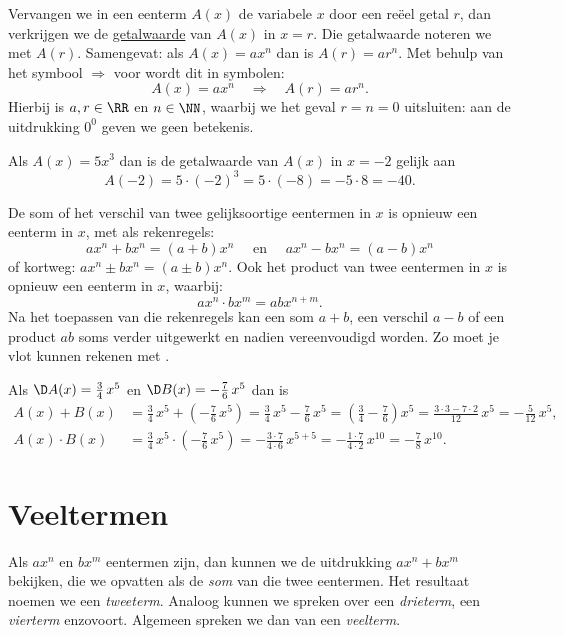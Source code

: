 \documentclass{ximera}
\begin{document}
Vervangen we in een eenterm $A(x)$ de variabele $x$ door een re\"eel getal $r$, dan verkrijgen we de \underline{getalwaarde} van $A(x)$ in $x = r$. Die getalwaarde noteren we met $A(r)$. Samengevat: als $A(x) = ax^n$ dan is $A(r) = ar^n$. Met behulp van het symbool $\Rightarrow$ voor  wordt dit in symbolen:
\[
A(x) = ax^n \quad \Rightarrow \quad A(r) = a r^n.
\]
Hierbij is $a,r \in \RR$ en $n \in \NN$, waarbij we het geval $r = n = 0$ uitsluiten: aan de uitdrukking $0^0$ geven we geen betekenis.

\begin{example}
Als $A(x) = 5x^3$ dan is de getalwaarde van $A(x)$ in $x = -2$ gelijk aan 
\[
A(-2) = 5 \cdot (-2)^3 = 5 \cdot (-8) = - 5 \cdot 8 = -40.
\]
\end{example}

De som of het verschil van twee gelijksoortige eentermen in $x$ is opnieuw een eenterm in $x$, met als rekenregels:
\[
ax^n + bx^n = (a+b)x^n \quad \text{ en } \quad ax^n - bx^n = (a-b)x^n
\]
of kortweg: $ax^n \pm bx^n = (a\pm b)x^n$. Ook het product van twee eentermen in $x$ is opnieuw een eenterm in $x$, waarbij:
\[
ax^n \cdot bx^m = abx^{n+m}.
\]
Na het toepassen van die rekenregels kan een som $a+b$, een verschil $a-b$ of een product $ab$ soms verder uitgewerkt en nadien vereenvoudigd worden. Zo moet je vlot kunnen rekenen met .

\begin{example}
Als $\D A(x) = \frac{3}{4}\,x^5$ en $\D B(x) = -\frac{7}{6}\,x^5$ dan is 
\begin{align*}
A(x) + B(x) & = \frac{3}{4}\,x^5 + \left(-\frac{7}{6}\,x^5\right) 
= \frac{3}{4}\,x^5 - \frac{7}{6}\,x^5
= \left(\frac{3}{4} - \frac{7}{6}\right)x^5 
= \frac{3 \cdot 3 - 7 \cdot 2}{12}\,x^5 
= -\frac{5}{12}\,x^5, \\
A(x) \cdot B(x) & = \frac{3}{4}\,x^5 \cdot \left(-\frac{7}{6}\,x^5\right) = - \frac{3 \cdot 7}{4 \cdot 6}\,x^{5+5} = -\frac{1\cdot 7}{4 \cdot 2}\, x^{10} = -\frac{7}{8}\,x^{10}. 
\end{align*}
\end{example}

\section{Veeltermen}

Als $ax^n$ en $bx^m$ eentermen zijn, dan kunnen we de uitdrukking $ax^n + bx^m$ bekijken, die we opvatten als de {\em som} van die twee eentermen. Het resultaat noemen we een {\em tweeterm}. Analoog kunnen we spreken over een {\em drieterm}, een {\em vierterm} enzovoort. Algemeen spreken we dan van een {\em veelterm}.
\end{document}
